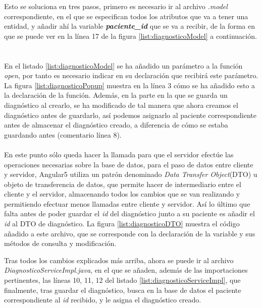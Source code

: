 Esto se soluciona en tres pasos, primero es necesario ir al archivo \emph{.model} correspondiente, en el que se especifican todos los atributos que va a tener una entidad, y añadir ahí la variable \textbf{\textit{paciente\_id}} que se va a recibir, de la forma en que se puede ver en la línea 17 de la figura \ref{list:diagnosticoModel} a continuación.
\\
\\
\\


En el listado \ref{list:diagnosticoModel} se ha añadido un parámetro a la función \emph{open}, por tanto es necesario indicar en su declaración que recibirá este parámetro. La figura \ref{list:diagnosticoPopup} muestra en la línea 3 cómo se ha añadido esto a la declaración de la función. Además, en la parte en la que se guarda un diagnóstico al crearlo, se ha modificado de tal manera que ahora creamos el diagnóstico antes de guardarlo, así podemos asignarlo al paciente correspondiente antes de almacenar el diagnóstico creado, a diferencia de cómo se estaba guardando antes (comentario línea 8).
\\
\\


En este punto sólo queda hacer la llamada para que el servidor efectúe las operaciones necesarias sobre la base de datos, para el paso de datos entre cliente y servidor, Angular5 utiliza un patrón denominado \emph{Data Transfer Object}(DTO) u objeto de transferencia de datos, que permite hacer de intermediario entre el cliente y el servidor, almacenando todos los cambios que se van realizando y permitiendo efectuar menos llamadas entre cliente y servidor. Así lo último que falta antes de poder guardar el \emph{id} del diagnóstico junto a su paciente es añadir el \emph{id} al DTO de diagnóstico. La figura \ref{list:diagnosticoDTO} muestra el código añadido a este archivo, que se corresponde con la declaración de la variable y sus métodos de consulta y modificación.



Tras todos los cambios explicados más arriba, ahora se puede ir al archivo \emph{DiagnosticoServiceImpl.java}, en el que se añaden, además de las importaciones pertinentes, las líneas 10, 11, 12 del listado \ref{list:diagnosticoServiceImpl}, que finalmente, tras guardar el diagnóstico, busca en la base de datos el paciente correspondiente al \emph{id} recibido, y le asigna el diagnóstico creado.

